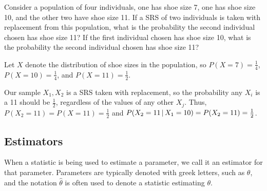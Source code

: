 \begin{examp} Consider a population of four individuals, one has shoe size 7, one has shoe size 10, and the other two have shoe size 11. If a SRS of two individuals is taken with replacement from this population, what is the probability the second individual chosen has shoe size 11? If the first individual chosen has shoe size 10, what is the probability the second individual chosen has shoe size 11?
\par
\noindent Let $X$ denote the distribution of shoe sizes in the population, so $P(X = 7) = \frac{1}{4}$, $P(X = 10) = \frac{1}{4}$, and $P(X = 11) = \frac{1}{2}$.
\par
\noindent Our sample $X_1, X_2$ is a SRS taken with replacement, so the probability any $X_i$ is a 11 should be $\frac{1}{2}$, regardless of the values of any other $X_j$. Thus, $P(X_2 = 11) = P(X = 11) = \textstyle\frac{1}{2}$ and $P(X_2 = 11 \,|\, X_1 = 10) = P(X_2 = 11) = \textstyle\frac{1}{2}$.
\end{examp}

\subsection*{Estimators}

When a statistic is being used to estimate a parameter, we call it an estimator for that parameter. Parameters are typically denoted with greek letters, such as $\theta$, and the notation $\widehat{\theta}$ is often used to denote a statistic estimating $\theta$.

